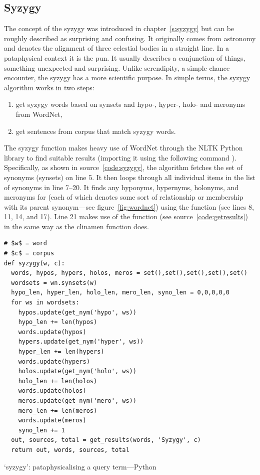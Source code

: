 \subsection{Syzygy}
\label{s:syzygyalgo}

The concept of the syzygy was introduced in chapter~\ref{s:syzygy} but can be roughly described as surprising and confusing. It originally comes from astronomy and denotes the alignment of three celestial bodies in a straight line. In a pataphysical context it is the pun. It usually describes a conjunction of things, something unexpected and surprising. Unlike serendipity, a simple chance encounter, the syzygy has a more scientific purpose. In simple terms, the syzygy algorithm works in two steps:

\begin{enumerate}
  \item get syzygy words based on synsets and hypo-, hyper-, holo- and meronyms from WordNet,
  \item get sentences from corpus that match syzygy words.
\end{enumerate}

The syzygy function makes heavy use of WordNet \autocite{Miller1995} through the \ac{NLTK} Python library \autocite{NLTK2016} to find suitable results (importing it using the following command ). Specifically, as shown in source~\ref{code:syzygy}, the algorithm fetches the set of synonyms (synsets) on line 5. It then loops through all individual items  in the list of synonyms  in line 7--20. It finds any hyponyms, hypernyms, holonyms, and meronyms for  (each of which denotes some sort of relationship or membership with its parent synonym---see figure~\ref{fig:wordnet}) using the  function (see lines 8, 11, 14, and 17). Line 21 makes use of the  function (see source~\ref{code:getresults}) in the same way as the clinamen function does.

\begin{listing}[!htbp] %
  \begin{verbatim}
# $w$ = word
# $c$ = corpus
def syzygy(w, c):
  words, hypos, hypers, holos, meros = set(),set(),set(),set(),set()
  wordsets = wn.synsets(w)
  hypo_len, hyper_len, holo_len, mero_len, syno_len = 0,0,0,0,0
  for ws in wordsets:
    hypos.update(get_nym('hypo', ws))
    hypo_len += len(hypos)
    words.update(hypos)
    hypers.update(get_nym('hyper', ws))
    hyper_len += len(hypers)
    words.update(hypers)
    holos.update(get_nym('holo', ws))
    holo_len += len(holos)
    words.update(holos)
    meros.update(get_nym('mero', ws))
    mero_len += len(meros)
    words.update(meros)
    syno_len += 1
  out, sources, total = get_results(words, 'Syzygy', c)
  return out, words, sources, total
  \end{verbatim}
\caption[`syzygy' function---Python]{`syzygy': pataphysicalising a query term---Python}
\label{code:syzygy}
\end{listing}

